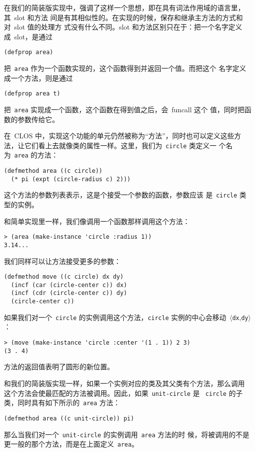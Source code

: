 在我们的简装版实现中，强调了这样一个思想，即在具有词法作用域的语言里，其~slot 和方法
间是有其相似性的。在实现的时候，保存和继承主方法的方式和对~slot 值的处理方
式没有什么不同。slot 和方法区别只在于：把一个名字定义成~slot，是通过
\begin{lstlisting}
(defprop area)
\end{lstlisting}
把~\texttt{area} 作为一个函数实现的，这个函数得到并返回一个值。而把这个
名字定义成一个方法，则是通过
\begin{lstlisting}
(defprop area t)
\end{lstlisting}
把~\texttt{area} 实现成一个函数，这个函数在得到值之后，会~funcall 这个
值，同时把函数的参数传给它。

在~CLOS 中，实现这个功能的单元仍然被称为``方法''，同时也可以定义这些方
法，让它们看上去就像类的属性一样。这里，我们为~\texttt{circle} 类定义一
个名为~\texttt{area} 的方法：
\begin{lstlisting}
(defmethod area ((c circle))
  (* pi (expt (circle-radius c) 2)))
\end{lstlisting}
这个方法的参数列表表示，这是个接受一个参数的函数，参数应该
是~\texttt{circle} 类型的实例。

和简单实现里一样，我们像调用一个函数那样调用这个方法：
\begin{lstlisting}
> (area (make-instance 'circle :radius 1))
3.14...
\end{lstlisting}
我们同样可以让方法接受更多的参数：
\begin{lstlisting}
(defmethod move ((c circle) dx dy)
  (incf (car (circle-center c)) dx)
  (incf (cdr (circle-center c)) dy)
  (circle-center c))
\end{lstlisting}
如果我们对一个~\texttt{circle} 的实例调用这个方法，\texttt{circle} 实例的中心会移动~$\langle$\texttt{dx},\texttt{dy}$\rangle$：
\begin{lstlisting}
> (move (make-instance 'circle :center '(1 . 1)) 2 3)
(3 . 4)
\end{lstlisting}
方法的返回值表明了圆形的新位置。

和我们的简装版实现一样，如果一个实例对应的类及其父类有个方法，那么调用
这个方法会使最匹配的方法被调用。因此，如果~\texttt{unit-circle} 是
~\texttt{circle} 的子类，同时具有如下所示的~\texttt{area} 方法：
\begin{lstlisting}
(defmethod area ((c unit-circle)) pi)
\end{lstlisting}
那么当我们对一个~\texttt{unit-circle} 的实例调用~\texttt{area} 方法的时
候，将被调用的不是更一般的那个方法，而是在上面定义~\texttt{area}。

